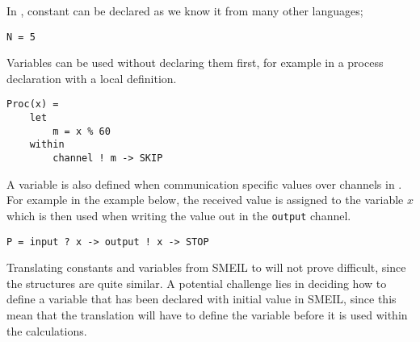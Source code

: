 In \cspm, constant can be declared as we know it from many other languages;
\begin{verbatim}
N = 5
\end{verbatim}
Variables can be used without declaring them first, for example in a process declaration with a local definition.
\begin{verbatim}
Proc(x) =
    let
        m = x % 60
    within
        channel ! m -> SKIP
\end{verbatim}
A variable is also defined when communication specific values over channels in \cspm. For example in the example below, the received value is assigned to the variable $x$ which is then used when writing the value out in the \texttt{output} channel.
\begin{verbatim}
P = input ? x -> output ! x -> STOP
\end{verbatim}

Translating constants and variables from SMEIL to \cspm will not prove difficult, since the structures are quite similar.
A potential challenge lies in deciding how to define a variable that has been declared with initial value in SMEIL, since this mean that the \cspm translation will have to define the variable before it is used within the calculations.\\




